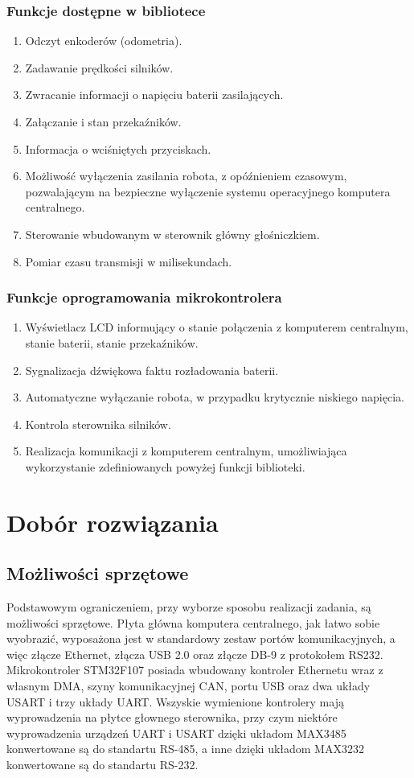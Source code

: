 \documentclass[10pt,a4paper]{article}
\begin{document}
	\subsubsection{Funkcje dostępne w bibliotece}
	\begin{enumerate}
		\item Odczyt enkoderów (odometria).
		\item Zadawanie prędkości silników.
		\item Zwracanie informacji o napięciu baterii zasilających.
		\item Załączanie i stan przekaźników.
		\item Informacja o wciśniętych przyciskach.
		\item Możliwość wyłączenia zasilania robota, z opóźnieniem czasowym, pozwalającym na bezpieczne wyłączenie systemu operacyjnego komputera centralnego.
		\item Sterowanie wbudowanym w sterownik główny głośniczkiem.
		\item Pomiar czasu transmisji w milisekundach.
	\end{enumerate} 
	\subsubsection{Funkcje oprogramowania mikrokontrolera}
	\begin{enumerate}
		\item Wyświetlacz LCD informujący o stanie połączenia z komputerem centralnym, stanie baterii, stanie przekaźników.
		\item Sygnalizacja dźwiękowa faktu rozładowania baterii.
		\item Automatyczne wyłączanie robota, w przypadku krytycznie niskiego napięcia.
		\item Kontrola sterownika silników.
		\item Realizacja komunikacji z komputerem centralnym, umożliwiająca wykorzystanie zdefiniowanych powyżej funkcji biblioteki.
	\end{enumerate}
	\section{Dobór rozwiązania}
	\subsection{Możliwości sprzętowe}
	Podstawowym ograniczeniem, przy wyborze sposobu realizacji zadania, są możliwości sprzętowe. Płyta główna komputera centralnego, jak łatwo sobie wyobrazić, wyposażona jest w standardowy zestaw portów komunikacyjnych, a więc złącze Ethernet, złącza USB 2.0 oraz złącze DB-9 z protokołem RS232. Mikrokontroler STM32F107 posiada wbudowany kontroler Ethernetu wraz z własnym DMA, szyny komunikacyjnej CAN, portu USB oraz dwa układy USART i trzy układy UART. Wszyskie wymienione kontrolery mają wyprowadzenia na płytce głownego sterownika, przy czym niektóre wyprowadzenia urządzeń UART i USART dzięki układom MAX3485 konwertowane są do standartu RS-485, a inne dzięki układom MAX3232 konwertowane są do standartu RS-232.
\end{document}
